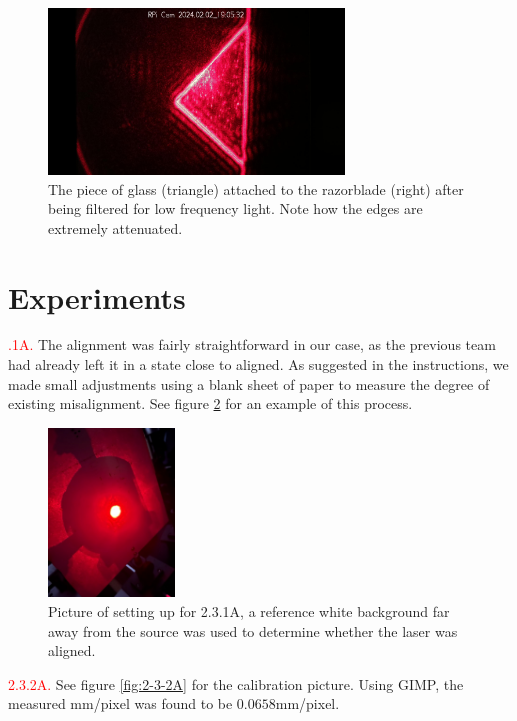 \documentclass[letterpaper, reqno,11pt]{article}
\begin{document}
\begin{figure}[h!]
    \centering
    \includegraphics[width=0.7\textwidth]{Fourier/5g/media/im_0229_20240202_190532.jpg}
    \caption{The piece of glass (triangle) attached to the razorblade (right) after being filtered for low frequency light. Note how the edges are extremely attenuated.}
    \label{fig:rn}
\end{figure}

\newpage

\section{Experiments}


\textcolor{red}{.1A.} The alignment was fairly straightforward in our case, as the previous team had already left it in a state close to aligned. As suggested in the instructions, we made small adjustments using a blank sheet of paper to measure the degree of existing misalignment. See figure \ref{fig:2-3-1A} for an example of this process.

\begin{figure}[tb]
    \centering
    \includegraphics[width=0.3\textwidth]{2.3.1A}
    \caption{Picture of setting up for 2.3.1A, a reference white background far away from the source was used to determine whether the laser was aligned.}
    \label{fig:2-3-1A}
\end{figure}

\noindent \textcolor{red}{2.3.2A.} See figure \ref{fig:2-3-2A} for the calibration picture. Using GIMP, the measured mm/pixel was found to be $0.0658$mm/pixel.
\end{document}
